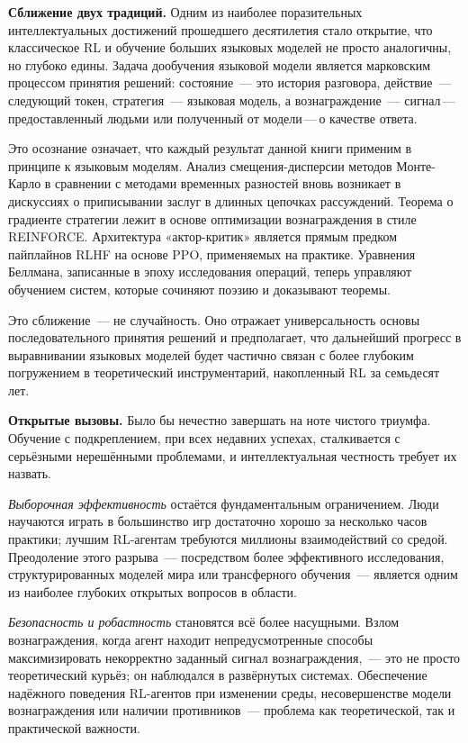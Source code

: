 \medskip

\textbf{Сближение двух традиций.}\quad
Одним из наиболее поразительных интеллектуальных достижений прошедшего десятилетия стало открытие, что классическое RL и обучение больших языковых моделей не просто аналогичны, но глубоко едины. Задача дообучения языковой модели является марковским процессом принятия решений: состояние~--- это история разговора, действие~--- следующий токен, стратегия~--- языковая модель, а вознаграждение~--- сигнал\,---\,предоставленный людьми или полученный от модели\,---\,о качестве ответа.

Это осознание означает, что каждый результат данной книги применим в принципе к языковым моделям. Анализ смещения-дисперсии методов Монте-Карло в сравнении с методами временных разностей вновь возникает в дискуссиях о приписывании заслуг в длинных цепочках рассуждений. Теорема о градиенте стратегии лежит в основе оптимизации вознаграждения в стиле REINFORCE. Архитектура «актор-критик» является прямым предком пайплайнов RLHF на основе PPO, применяемых на практике. Уравнения Беллмана, записанные в эпоху исследования операций, теперь управляют обучением систем, которые сочиняют поэзию и доказывают теоремы.

Это сближение~--- не случайность. Оно отражает универсальность основы последовательного принятия решений и предполагает, что дальнейший прогресс в выравнивании языковых моделей будет частично связан с более глубоким погружением в теоретический инструментарий, накопленный RL за семьдесят лет.

\medskip

\textbf{Открытые вызовы.}\quad
Было бы нечестно завершать на ноте чистого триумфа. Обучение с подкреплением, при всех недавних успехах, сталкивается с серьёзными нерешёнными проблемами, и интеллектуальная честность требует их назвать.

\emph{Выборочная эффективность} остаётся фундаментальным ограничением. Люди научаются играть в большинство игр достаточно хорошо за несколько часов практики; лучшим RL-агентам требуются миллионы взаимодействий со средой. Преодоление этого разрыва~--- посредством более эффективного исследования, структурированных моделей мира или трансферного обучения~--- является одним из наиболее глубоких открытых вопросов в области.

\emph{Безопасность и робастность} становятся всё более насущными. Взлом вознаграждения, когда агент находит непредусмотренные способы максимизировать некорректно заданный сигнал вознаграждения,~--- это не просто теоретический курьёз; он наблюдался в развёрнутых системах. Обеспечение надёжного поведения RL-агентов при изменении среды, несовершенстве модели вознаграждения или наличии противников~--- проблема как теоретической, так и практической важности.

